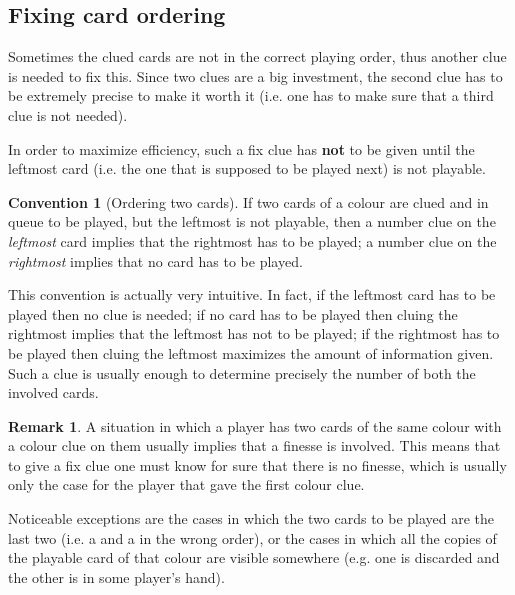 \documentclass[a4paper]{article}
\theoremstyle{plain}
\theoremstyle{definition}
\newtheorem{remark}[theorem]{Remark}
\newtheorem{convention}[theorem]{Convention}
\begin{document}
\subsection{Fixing card ordering}

Sometimes the clued cards are not in the correct playing order, thus another clue is needed to fix this. Since two clues are a big investment, the second clue has to be extremely precise to make it worth it (i.e. one has to make sure that a third clue is not needed).

In order to maximize efficiency, such a fix clue has \textbf{not} to be given until the leftmost card (i.e. the one that is supposed to be played next) is not playable.

\begin{convention}[Ordering two cards]
	If two cards of a colour are clued and in queue to be played, but the leftmost is not playable, then a number clue on the \textit{leftmost} card implies that the rightmost has to be played; a number clue on the \textit{rightmost} implies that no card has to be played.
\end{convention}

This convention is actually very intuitive. In fact, if the leftmost card has to be played then no clue is needed; if no card has to be played then cluing the rightmost implies that the leftmost has not to be played; if the rightmost has to be played then cluing the leftmost maximizes the amount of information given. Such a clue is usually enough to determine precisely the number of both the involved cards.

\begin{remark}
	A situation in which a player has two cards of the same colour with a colour clue on them usually implies that a finesse is involved. This means that to give a fix clue one must know for sure that there is no finesse, which is usually only the case for the player that gave the first colour clue.
	
	Noticeable exceptions are the cases in which the two cards to be played are the last two (i.e. a  and a  in the wrong order), or the cases in which all the copies of the playable card of that colour are visible somewhere (e.g. one is discarded and the other is in some player's hand).
\end{remark}
\end{document}
